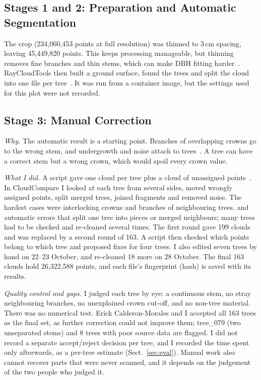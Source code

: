 \documentclass[runningheads]{llncs}
\begin{document}
\subsection{Stages 1 and 2: Preparation and Automatic Segmentation}\label{sec:prep}
The crop (234,060,453 points at full resolution) was thinned to 3\,cm spacing, leaving 45,449,820 points. This keeps processing manageable, but thinning removes fine branches and thin stems, which can make DBH fitting harder~\cite{calders2020}. RayCloudTools then built a ground surface, found the trees and split the cloud into one file per tree~\cite{pipeline}. It was run from a container image, but the settings used for this plot were not recorded.

\subsection{Stage 3: Manual Correction}\label{sec:manual}
\emph{Why.} The automatic result is a starting point. Branches of overlapping crowns go to the wrong stem, and undergrowth and noise attach to trees~\cite{calders2020,cherlet2026}. A tree can have a correct stem but a wrong crown, which would spoil every crown value.

\emph{What I did.} A script gave one cloud per tree plus a cloud of unassigned points~\cite{pipeline}. In CloudCompare I looked at each tree from several sides, moved wrongly assigned points, split merged trees, joined fragments and removed noise. The hardest cases were interlocking crowns and branches of neighbouring trees, and automatic errors that split one tree into pieces or merged neighbours; many trees had to be checked and re-cleaned several times. The first round gave 199 clouds and was replaced by a second round of 163. A script then checked which points belong to which tree and proposed fixes for four trees. I also edited seven trees by hand on 22--23 October, and re-cleaned 18 more on 28 October. The final 163 clouds hold 26,322,588 points, and each file's fingerprint (hash) is saved with its results.

\emph{Quality control and gaps.} I judged each tree by eye: a continuous stem, no stray neighbouring branches, no unexplained crown cut-off, and no non-tree material. There was no numerical test. Erick Calderon-Morales and I accepted all 163 trees as the final set, as further correction could not improve them; tree\_079 (two unseparated stems) and 8 trees with poor source data are flagged. I did not record a separate accept/reject decision per tree, and I recorded the time spent only afterwards, as a per-tree estimate (Sect.~\ref{sec:eval}). Manual work also cannot recover parts that were never scanned, and it depends on the judgement of the two people who judged it.
\end{document}

